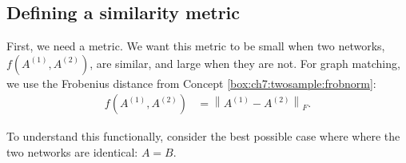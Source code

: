 \subsection{Defining a similarity metric}

First, we need a metric. We want this metric to be small when two networks, $f\left(A^{(1)}, A^{(2)}\right)$, are similar, and large when they are not. For graph matching, we use the Frobenius distance from Concept \ref{box:ch7:twosample:frobnorm}:
\begin{align*}
    f\left(A^{(1)}, A^{(2)}\right) &= \left\|A^{(1)} - A^{(2)}\right\|_F.
\end{align*}

To understand this functionally, consider the best possible case where where the two networks are identical: $A=B$. 

